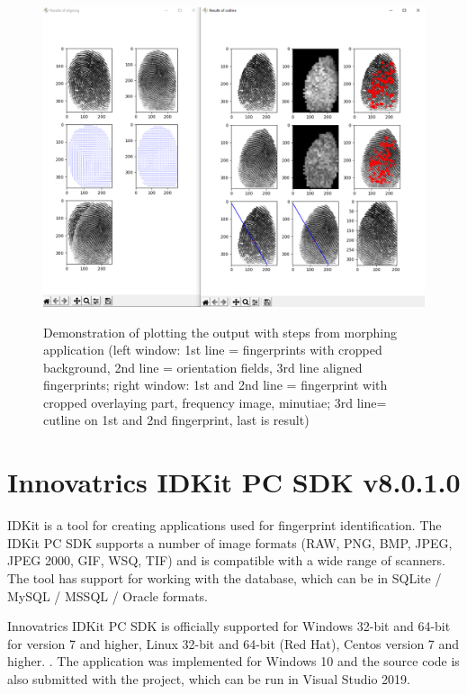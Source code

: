 \begin{figure}[H]
    \centering
        {\includegraphics[width=1\linewidth]{obrazky-figures/app_plot.png}}\\
        \caption{Demonstration of plotting the output with steps from morphing application (left window: 1st line = fingerprints with cropped background, 2nd line = orientation fields, 3rd line aligned fingerprints; right window: 1st and 2nd line = fingerprint with cropped overlaying part, frequency image, minutiae; 3rd line= cutline on 1st and 2nd fingerprint, last is result)}
        \label{fig:app_plot}
\end{figure}

\section{Innovatrics IDKit PC SDK v8.0.1.0}
IDKit \cite{innovatricsonline} is a tool for creating applications used for fingerprint identification. The IDKit PC SDK supports a number of image formats (RAW, PNG, BMP, JPEG, JPEG 2000, GIF, WSQ, TIF) and is compatible with a wide range of scanners. The tool has support for working with the database, which can be in SQLite / MySQL / MSSQL / Oracle formats. \cite{idkitsdk}

Innovatrics IDKit PC SDK is officially supported for Windows 32-bit and 64-bit for version 7 and higher, Linux 32-bit and 64-bit (Red Hat), Centos version 7 and higher. \cite{idkitsdk}. The application was implemented for Windows 10 and the source code is also submitted with the project, which can be run in Visual Studio 2019.

